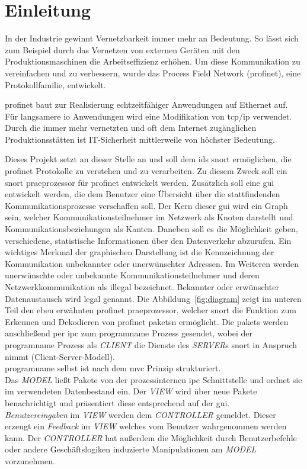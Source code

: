 \chapter{Einleitung}

In der Industrie gewinnt Vernetzbarkeit immer mehr an Bedeutung. So lässt sich zum Beispiel durch das Vernetzen von externen Geräten mit den Produktionsmaschinen die Arbeitseffizienz erhöhen. Um diese Kommunikation zu vereinfachen und zu verbessern, wurde das Process Field Network (\gls{profinet}), eine Protokollfamilie, entwickelt.\par
\gls{profinet} baut zur Realisierung echtzeitfähiger Anwendungen auf Ethernet auf. Für langsamere \gls{io} Anwendungen wird eine Modifikation von \gls{tcp}/\gls{ip} verwendet. Durch die immer mehr vernetzten und oft dem Internet zugänglichen Produktionsstätten ist IT-Sicherheit mittlerweile von höchster Bedeutung. \par
Dieses Projekt setzt an dieser Stelle an und soll dem \gls{ids} \gls{snort} ermöglichen, die \gls{profinet} Protokolle zu verstehen und zu verarbeiten. Zu diesem Zweck soll ein \gls{snort} \gls{praeprozessor} für \gls{profinet} entwickelt werden. Zusätzlich soll eine \gls{gui} entwickelt werden, die dem Benutzer eine Übersicht über die stattfindenden Kommunikationsprozesse verschaffen soll. Der Kern dieser \gls{gui} wird ein Graph sein, welcher Kommunikationsteilnehmer im Netzwerk als Knoten darstellt und Kommunikationsbeziehungen als Kanten. Daneben soll es die Möglichkeit geben, verschiedene, statistische Informationen über den Datenverkehr abzurufen.
Ein wichtiges Merkmal der graphischen Darstellung ist die Kennzeichnung der Kommunikation unbekannter oder unerwünschter Adressen. Im Weiteren werden unerwünschte oder unbekannte Kommunikationsteilnehmer und deren Netzwerkkommunikation als illegal bezeichnet. Bekannter oder erwünschter Datenaustausch wird legal genannt.
Die Abbildung~\ref{fig:diagram} zeigt im unteren Teil den eben erwähnten \gls{profinet} \gls{praeprozessor}, welcher \gls{snort} die Funktion zum Erkennen und Dekodieren von \gls{profinet} \glspl{paket}n ermöglicht. Die \glspl{paket} werden anschließend per \gls{ipc} zum \gls{programname} Prozess gesendet, wobei der \gls{programname} Prozess als \textit{CLIENT} die Dienste des \textit{SERVER}s \gls{snort} in Anspruch nimmt (Client-Server-Modell).\\
\Gls{programname} selbst ist nach dem \gls{mvc} Prinzip strukturiert.\\
Das \textit{MODEL} ließt Pakete von der prozessinternen \gls{ipc} Schnittstelle und ordnet sie im verwendeten Datenbestand ein. Der \textit{VIEW} wird über neue Pakete benachrichtigt und präsentiert diese entsprechend auf der \gls{gui}.\\
\textit{Benutzereingaben} im \textit{VIEW} werden dem \textit{CONTROLLER} gemeldet. Dieser erzeugt ein \textit{Feedback} im \textit{VIEW} welches vom Benutzer wahrgenommen werden kann. Der \textit{CONTROLLER} hat außerdem die Möglichkeit durch Benutzerbefehle oder andere Geschäftslogiken induzierte Manipulationen am \textit{MODEL} vorzunehmen.

